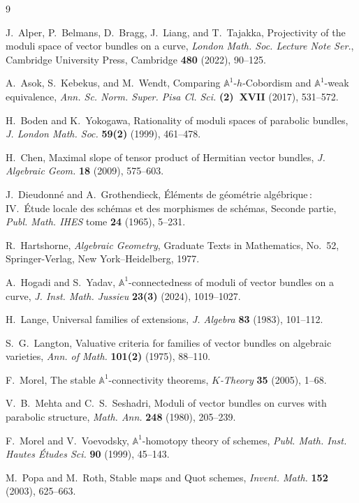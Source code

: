 \documentclass[12pt,reqno]{amsart}
\newcommand{\bb}[1]{\mathbb{#1}}
\theoremstyle{definition}
\numberwithin{equation}{section}
\begin{document}
	

	\begin{thebibliography}{9}
		
		J.~Alper, P.~Belmans, D.~Bragg, J.~Liang, and T.~Tajakka,
		Projectivity of the moduli space of vector bundles on a curve,
		\textit{London Math. Soc. Lecture Note Ser.},
		Cambridge University Press, Cambridge \textbf{480} (2022), 90--125.
		
		A.~Asok, S.~Kebekus, and M.~Wendt,
		Comparing $\bb{A}^1$-$h$-Cobordism and $\bb{A}^1$-weak equivalence,
		\textit{Ann. Sc. Norm. Super. Pisa Cl. Sci.} \textbf{(2)~XVII} (2017),
		531--572.
		
		H.~Boden and K.~Yokogawa,
		Rationality of moduli spaces of parabolic bundles,
		\textit{J. London Math. Soc.} \textbf{59(2)} (1999), 461--478.
		
		H.~Chen,
		Maximal slope of tensor product of Hermitian vector bundles,
		\textit{J. Algebraic Geom.} \textbf{18} (2009), 575--603.
		
		J.~Dieudonn\'e and A.~Grothendieck,
		\'El\'ements de g\'eom\'etrie alg\'ebrique\,: IV.~\'Etude locale des
		sch\'emas et des morphismes de sch\'emas, Seconde partie,
		\textit{Publ. Math. IHES} tome \textbf{24} (1965), 5--231.
		
		R.~Hartshorne,
		\textit{Algebraic Geometry},
		Graduate Texts in Mathematics, No.~52,
		Springer-Verlag, New York--Heidelberg, 1977.
		
		A.~Hogadi and S.~Yadav,
		${\mathbb A}^1$-connectedness of moduli of vector bundles on a curve,
		\textit{J. Inst. Math. Jussieu} \textbf{23(3)} (2024), 1019--1027.
		
		H.~Lange,
		Universal families of extensions,
		\textit{J. Algebra} \textbf{83} (1983), 101--112.
		
		S.~G.~Langton,
		Valuative criteria for families of vector bundles on algebraic varieties,
		\textit{Ann. of Math.} \textbf{101(2)} (1975), 88--110.
		
		F.~Morel,
		The stable $\mathbb{A}^1$-connectivity theorems,
		\textit{$K$-Theory} \textbf{35} (2005), 1--68.
		
		V.~B.~Mehta and C.~S.~Seshadri,
		Moduli of vector bundles on curves with parabolic structure,
		\textit{Math. Ann.} \textbf{248} (1980), 205--239.
		
		F.~Morel and V.~Voevodsky,
		$\bb{A}^1$-homotopy theory of schemes,
		\textit{Publ. Math. Inst. Hautes \'Etudes Sci.} \textbf{90} (1999), 45--143.
		
		M.~Popa and M.~Roth,
		Stable maps and Quot schemes,
		\textit{Invent. Math.} \textbf{152} (2003), 625--663.
		
		
	\end{thebibliography}
\end{document}
